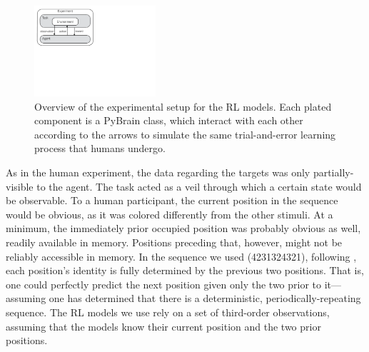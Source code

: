 \documentclass[man,floatsintext]{apa6}
\begin{document}
\begin{figure}[ht]
  \centering
  \includegraphics[width=0.4\textwidth]{figures/RL_model}
  \caption{Overview of the experimental setup for the RL models. Each plated component is a PyBrain class, which interact with each other according to the arrows to simulate the same trial-and-error learning process that humans undergo.}
  \label{fig:rl-model}
\end{figure} 

As in the human experiment, the data regarding the targets was only partially-visible to the agent. The task acted as a veil through which a certain state would be observable. To a human participant, the current position in the sequence would be obvious, as it was colored differently from the other stimuli. At a minimum, the immediately prior occupied position was probably obvious as well, readily available in memory. Positions preceding that, however, might not be reliably accessible in memory. In the sequence we used (4231324321), following , each position's identity is fully determined by the previous two positions. That is, one could perfectly predict the next position given only the two prior to it---assuming one has determined that there is a deterministic, periodically-repeating sequence. The RL models we use rely on a set of third-order observations, assuming that the models know their current position and the two prior positions.

\end{document}
